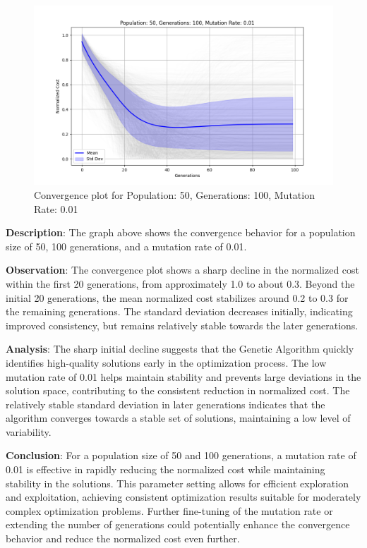 \documentclass{article}
\begin{document}
    \begin{figure}[H]
        \centering
        \includegraphics[width=\textwidth]{genetic_algorithm/Population_50_Generations_100_MutationRate_0.01}
        \caption{Convergence plot for Population: 50, Generations: 100, Mutation Rate: 0.01}
        \label{fig:ga_50_100_01}
    \end{figure}

    \textbf{Description}: The graph above shows the convergence behavior for a population size of 50, 100 generations, and a mutation rate of 0.01.

    \textbf{Observation}: The convergence plot shows a sharp decline in the normalized cost within the first 20 generations, from approximately 1.0 to about 0.3. Beyond the initial 20 generations, the mean normalized cost stabilizes around 0.2 to 0.3 for the remaining generations. The standard deviation decreases initially, indicating improved consistency, but remains relatively stable towards the later generations.

    \textbf{Analysis}: The sharp initial decline suggests that the Genetic Algorithm quickly identifies high-quality solutions early in the optimization process. The low mutation rate of 0.01 helps maintain stability and prevents large deviations in the solution space, contributing to the consistent reduction in normalized cost. The relatively stable standard deviation in later generations indicates that the algorithm converges towards a stable set of solutions, maintaining a low level of variability.

    \textbf{Conclusion}: For a population size of 50 and 100 generations, a mutation rate of 0.01 is effective in rapidly reducing the normalized cost while maintaining stability in the solutions. This parameter setting allows for efficient exploration and exploitation, achieving consistent optimization results suitable for moderately complex optimization problems. Further fine-tuning of the mutation rate or extending the number of generations could potentially enhance the convergence behavior and reduce the normalized cost even further.
\end{document}
